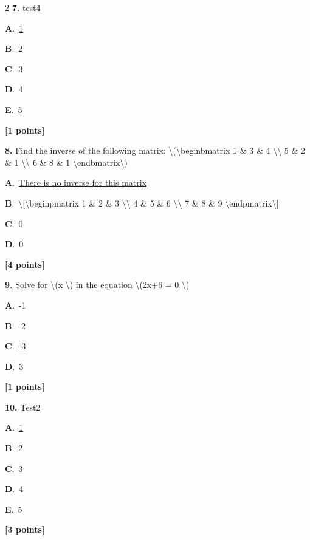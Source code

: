 \documentclass[12pt]{article}
\newcommand{\choice}[3]{%
  \noindent\textbf{#1}.~#2\hfill#3\par\vspace{0.25em}
}
\begin{document}
\begin{multicols}{2}
\noindent \textbf{\textenglish{7.}} {\textenglish{test4}}

\noindent\choice{A}{\underline{{\textenglish{1}}}}{}
\noindent\choice{B}{{\textenglish{2}}}{}
\noindent\choice{C}{{\textenglish{3}}}{}
\noindent\choice{D}{{\textenglish{4}}}{}
\noindent\choice{E}{{\textenglish{5}}}{}
\hfill \textbf{[1 points]}\vspace{0.5em}

\noindent \textbf{\textenglish{8.}} {\textenglish{Find the inverse of the following matrix: \textbackslash{}(\textbackslash{}begin{bmatrix} 1 \& 3 \& 4 \textbackslash{}\textbackslash{} 5 \& 2 \& 1 \textbackslash{}\textbackslash{} 6 \& 8 \& 1 \textbackslash{}end{bmatrix}\textbackslash{})}}

\noindent\choice{A}{\underline{{\textenglish{There is no inverse for this matrix}}}}{}
\noindent\choice{B}{{\textenglish{\textbackslash{}[\textbackslash{}begin{pmatrix} 1 \& 2 \& 3 \textbackslash{}\textbackslash{} 4 \& 5 \& 6 \textbackslash{}\textbackslash{} 7 \& 8 \& 9  \textbackslash{}end{pmatrix}\textbackslash{}]}}}{}
\noindent\choice{C}{{\textenglish{0}}}{}
\noindent\choice{D}{{\textenglish{0}}}{}
\hfill \textbf{[4 points]}\vspace{0.5em}

\noindent \textbf{\textenglish{9.}} {\textenglish{Solve for \textbackslash{}(x \textbackslash{}) in the equation \textbackslash{}(2x+6 = 0 \textbackslash{})}}

\noindent\choice{A}{{\textenglish{-1}}}{}
\noindent\choice{B}{{\textenglish{-2}}}{}
\noindent\choice{C}{\underline{{\textenglish{-3}}}}{}
\noindent\choice{D}{{\textenglish{3}}}{}
\hfill \textbf{[1 points]}\vspace{0.5em}

\noindent \textbf{\textenglish{10.}} {\textenglish{Test2}}

\noindent\choice{A}{\underline{{\textenglish{1}}}}{}
\noindent\choice{B}{{\textenglish{2}}}{}
\noindent\choice{C}{{\textenglish{3}}}{}
\noindent\choice{D}{{\textenglish{4}}}{}
\noindent\choice{E}{{\textenglish{5}}}{}
\hfill \textbf{[3 points]}\vspace{0.5em}


\end{multicols}
\end{document}
